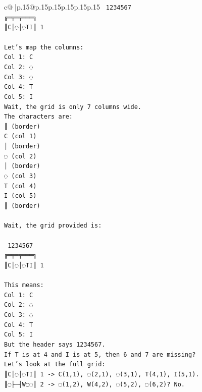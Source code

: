 \documentclass{article}
\begin{document}
{\begin{supertabular}{c@{$\;$}|p{.15\linewidth}@{}p{.15\linewidth}p{.15\linewidth}p{.15\linewidth}p{.15\linewidth}p{.15\linewidth}}
{{{\texttt{ 1234567} \\
\texttt{╔═╤═╤═══╗} \\
\texttt{║C│◌│◌TI║ 1} \\
\\ 
\texttt{Let's map the columns:} \\
\texttt{Col 1: C} \\
\texttt{Col 2: ◌} \\
\texttt{Col 3: ◌} \\
\texttt{Col 4: T} \\
\texttt{Col 5: I} \\
\texttt{Wait, the grid is only 7 columns wide.} \\
\texttt{The characters are:} \\
\texttt{║ (border)} \\
\texttt{C (col 1)} \\
\texttt{│ (border)} \\
\texttt{◌ (col 2)} \\
\texttt{│ (border)} \\
\texttt{◌ (col 3)} \\
\texttt{T (col 4)} \\
\texttt{I (col 5)} \\
\texttt{║ (border)} \\
\\ 
\texttt{Wait, the grid provided is:} \\
\\ 
\texttt{ 1234567} \\
\texttt{╔═╤═╤═══╗} \\
\texttt{║C│◌│◌TI║ 1} \\
\\ 
\texttt{This means:} \\
\texttt{Col 1: C} \\
\texttt{Col 2: ◌} \\
\texttt{Col 3: ◌} \\
\texttt{Col 4: T} \\
\texttt{Col 5: I} \\
\texttt{But the header says 1234567.} \\
\texttt{If T is at 4 and I is at 5, then 6 and 7 are missing?} \\
\texttt{Let's look at the full grid:} \\
\texttt{║C│◌│◌TI║ 1 {-}> C(1,1), ◌(2,1), ◌(3,1), T(4,1), I(5,1).} \\
\texttt{║◌├─┤W◌◌║ 2 {-}> ◌(1,2), W(4,2), ◌(5,2), ◌(6,2)? No.} \\
\\ 
}}}
\end{supertabular}}
\end{document}
